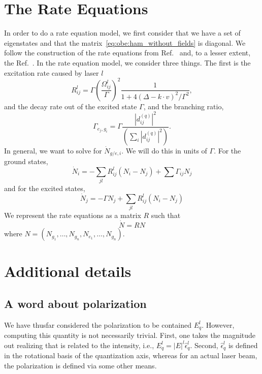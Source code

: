 \documentclass[final,5p,times,twocolumn]{elsarticle}
\begin{document}
\section{The Rate Equations}
In order to do a rate equation model, we first consider that we have a set of
eigenstates and that the matrix~\ref{eq:obe:ham_without_fields} is diagonal.  We
follow the construction of the rate equations from Ref.~\cite{Tarbutt2015} and,
to a lesser extent, the Ref.~\cite{Tollett1995}.
In the rate equation model, we consider three things.  The first is the
excitation rate caused by laser $l$
\begin{equation}
    \label{eq:lcp:scattering_rate}
    R^l_{ij} = \Gamma \left(\frac{\Omega^l_{ij}}{\Gamma}\right)^2\frac{1}{1 + 4(\Delta - k\cdot v)^2/\Gamma^2},
\end{equation}
and the decay rate out of the excited state $\Gamma$, and the branching ratio,
\begin{equation}
    \Gamma_{e_j,g_i} = \Gamma \frac{\left|d^{(q)}_{ij}\right|^2}{\left(\sum_i \left|d^{(q)}_{ij}\right|^2\right)}.
\end{equation}
In general, we want to solve for $\dot{N}_{g/e,i}$.  We will do this in units of
$\Gamma$.  For the ground states,
\begin{equation}
    \dot{N}_i = -\sum_{jl} R^l_{ij} (N_i - N_j) + \sum \Gamma_{ij}N_j
\end{equation}
and for the excited states,
\begin{equation}
    \dot{N}_j = - \Gamma N_j + \sum_{jl} R^l_{ij} (N_i - N_j)
\end{equation}
We represent the rate equations as a matrix $R$ such that
\begin{equation}
    \dot{N} = R N
\end{equation}
where $N = (N_{g_1},\dots, N_{g_n}, N_{e_1}, \dots, N_{g_n})$.

\section{Additional details}

\subsection{A word about polarization}
We have thusfar considered the polarization to be contained $E^l_q$.  However,
computing this quantity is not necessarily trivial.  First, one takes the
magnitude out realizing that is related to the intensity, i.e., $E^l_q =
|E|^l\hat{\epsilon}^l_q$.  Second, $\hat{\epsilon}^l_q$ is defined in the
rotational basis of the quantization axis, whereas for an actual laser beam,
the polarization is defined via some other means.
\end{document}
